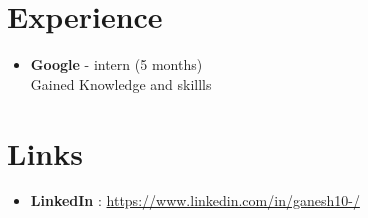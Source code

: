 \documentclass{article}
\begin{document}
\section*{Experience}
\begin{itemize}[leftmargin=*]
    
        \item \textbf{ Google } - intern (5 months) \\
        Gained Knowledge and skillls
    
\end{itemize}



\section*{Links}
\begin{itemize}[leftmargin=*]
    
        \item \textbf{ LinkedIn }: \href{ https://www.linkedin.com/in/ganesh10-/ }{ https://www.linkedin.com/in/ganesh10-/ }
    
\end{itemize}
\end{document}
